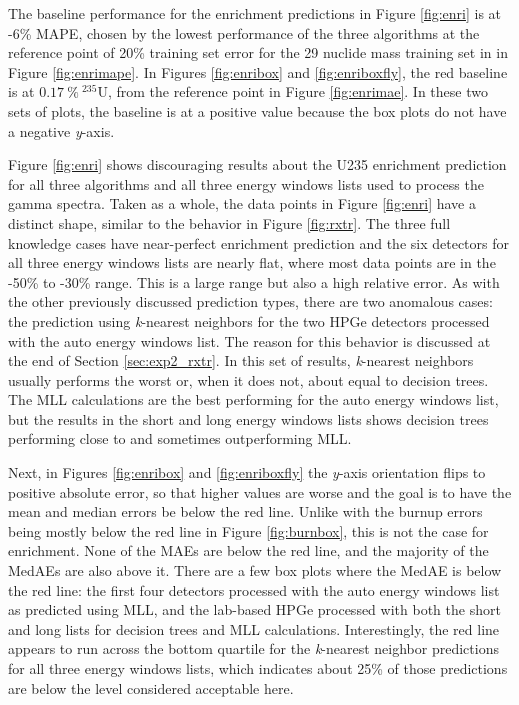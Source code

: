 The baseline performance for the enrichment predictions in Figure
\ref{fig:enri} is at -6\% \gls{MAPE}, chosen by the lowest performance of the
three algorithms at the reference point of 20\% training set error for the 29
nuclide mass training set in in Figure \ref{fig:enrimape}. In Figures
\ref{fig:enribox} and \ref{fig:enriboxfly}, the red baseline is at
$0.17\:\%\:{}^{235}\text{U}$, from the reference point in Figure
\ref{fig:enrimae}.  In these two sets of plots, the baseline is at a positive
value because the box plots do not have a negative \textit{y}-axis. 

Figure \ref{fig:enri} shows discouraging results about the \gls{U235}
enrichment prediction for all three algorithms and all three energy windows
lists used to process the gamma spectra.  Taken as a whole, the data points in
Figure \ref{fig:enri} have a distinct shape, similar to the behavior in Figure
\ref{fig:rxtr}.  The three full knowledge cases have near-perfect enrichment
prediction and the six detectors for all three energy windows lists are nearly
flat, where most data points are in the -50\% to -30\% range. This is a large
range but also a high relative error.  As with the other previously discussed
prediction types, there are two anomalous cases: the prediction using
\textit{k}-nearest neighbors for the two \gls{HPGe} detectors processed with
the auto energy windows list. The reason for this behavior is discussed at the
end of Section \ref{sec:exp2_rxtr}. In this set of results, \textit{k}-nearest
neighbors usually performs the worst or, when it does not, about equal to
decision trees. The \gls{MLL} calculations are the best performing for the auto
energy windows list, but the results in the short and long energy windows lists
shows decision trees performing close to and sometimes outperforming \gls{MLL}.

Next, in Figures \ref{fig:enribox} and \ref{fig:enriboxfly} the \textit{y}-axis
orientation flips to positive absolute error, so that higher values are worse
and the goal is to have the mean and median errors be below the red line.
Unlike with the burnup errors being mostly below the red line in Figure
\ref{fig:burnbox}, this is not the case for enrichment. None of the \gls{MAE}s
are below the red line, and the majority of the \gls{MedAE}s are also above it.
There are a few box plots where the \gls{MedAE} is below the red line: the
first four detectors processed with the auto energy windows list as predicted
using \gls{MLL}, and the lab-based \gls{HPGe} processed with both the short and
long lists for decision trees and \gls{MLL} calculations.  Interestingly, the
red line appears to run across the bottom quartile for the \textit{k}-nearest
neighbor predictions for all three energy windows lists, which indicates about
25\% of those predictions are below the level considered acceptable here.  

